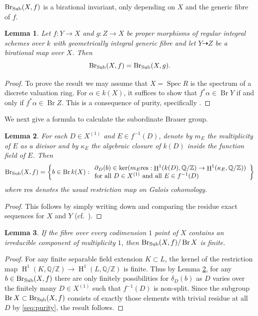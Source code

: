 \documentclass[a4paper,12pt,reqno]{amsart}
\numberwithin{equation}{section} \numberwithin{figure}{section}
\DeclareMathOperator{\Spec}{Spec}
\DeclareMathOperator{\Br}{Br} \DeclareMathOperator{\Brnr}{Br_{nr}}
\DeclareMathOperator{\HH}{H}
\newcommand\Z{\mathbb{Z}}
\newcommand\Q{\mathbb{Q}}
\renewcommand{\#}{\sharp}
\newtheorem{lemma}{Lemma}
\theoremstyle{definition}
\numberwithin{lemma}{section}
\begin{document}
$\operatorname{Br_{\mathrm{Sub}}}(X,f)$ is a birational invariant, only depending on $X$ and the generic fibre of $f$.

\begin{lemma} \label{lem:Sub_birational}
	Let $f:Y \to X$ and $g:Z \to X$ be proper morphisms of regular integral schemes over $k$
	with geometrically integral generic fibre and let 
	$Y \dashrightarrow Z$ be a birational map over $X$. Then
	$$\operatorname{Br_{\mathrm{Sub}}}(X,f) = \operatorname{Br_{\mathrm{Sub}}}(X,g).$$
\end{lemma}
\begin{proof}
	To prove the result we may assume that $X= \Spec R$ is the spectrum of a discrete
	valuation ring. For $\alpha \in k(X)$, it suffices to show that $f^* \alpha \in \Br Y$
	if and only if $f^* \alpha \in \Br Z$. This is a consequence of purity, specifically
	\cite[Prop.~3.7.9]{Brauer}.
\end{proof}

We next give a formula to calculate the subordinate Brauer group.

\begin{lemma} \label{lem:Sub_formula}
	For each $D \in X^{(1)}$ and $E \in f^{-1}(D)$, denote by $m_E$ the multiplicity of $E$
	as a divisor and by $\kappa_E$ the algebraic closure of $k(D)$ inside the function field of $E$. Then 
$$\Sub(X,f)=\left\{ b \in \Br k(X) :
\begin{array}{l}
\res_D(b) \in \ker( m_E \mathrm{res} : \HH^1(k(D),\Q/\Z) \to \HH^1(\kappa_E, \Q/\Z)) \\
 \text{for all } D \in X^{(1)} \text{ and all } E \in f^{-1}(D)
\end{array}\right\}$$
where $\mathrm{res}$ denotes the usual restriction map on Galois cohomology.
\end{lemma}
\begin{proof}
	This follows by simply writing down and comparing the residue exact
	sequences for $X$ and $Y$ (cf.~\cite[Prop.~10.1.4]{Brauer}).
\end{proof}

\begin{lemma} \label{lem:codim_1_finite}
	If the fibre over every codimension $1$ point of $X$ contains
	an irreducible component of multiplicity $1$, then 
	$\Sub(X,f)/\Br X$ is finite.
\end{lemma}
\begin{proof}
	For any finite separable field extension $K \subset L$, the kernel
	of the restriction map $\HH^1(K,\Q/\Z) \to \HH^1(L, \Q/\Z)$ is finite.
	Thus by Lemma \ref{lem:Sub_formula}, 
	for any $b \in \operatorname{Br_{\mathrm{Sub}}}(X,f)$ there are only finitely possibilities
	for $\delta_D(b)$ as $D$ varies over the finitely many $D \in X^{(1)}$
	such that $f^{-1}(D)$ is non-split. Since the subgroup 
	$\Br X \subset \Sub(X,f)$ consists of exactly those elements with trivial
	residue at all $D$ by \eqref{seq:purity}, the result follows.
\end{proof}
\end{document}
